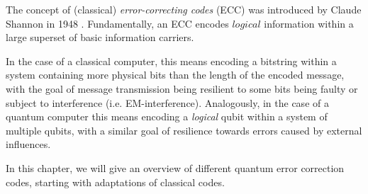 The concept of (classical) \emph{error-correcting codes} (ECC) was
introduced by Claude Shannon in 1948 \cite{shannon}.
Fundamentally, an ECC encodes $logical$ information within
a large superset of basic information carriers.

In the case of a classical computer, this means encoding a
bitstring within a system containing more physical bits
than the length of the encoded message, with the goal of message transmission
being resilient to some bits being faulty or subject to interference (i.e. EM-interference).
Analogously, in the case of a quantum computer this means encoding a \emph{logical}
qubit within a system of multiple qubits, with a similar goal of resilience towards
errors caused by external influences.

In this chapter, we will give an overview of different quantum error correction codes,
starting with adaptations of classical codes.

\newpage


\newpage